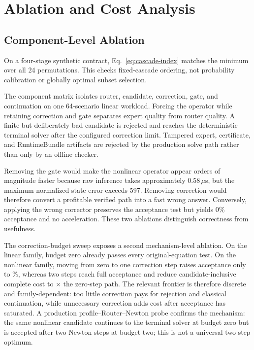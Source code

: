 \section{Ablation and Cost Analysis}
\label{sec:ablation}

\subsection{Component-Level Ablation}

On a four-stage synthetic contract, Eq.~\eqref{eq:cascade-index} matches the
minimum over all 24 permutations. This checks fixed-cascade ordering, not
probability calibration or globally optimal subset selection.

The component matrix isolates router, candidate, correction, gate, and continuation on
one 64-scenario linear workload. Forcing the operator while
retaining correction and gate separates expert quality from router quality. A
finite but deliberately bad candidate is rejected and reaches the deterministic terminal
solver after the configured correction limit. Tampered expert, certificate, and
RuntimeBundle artifacts are rejected by the production solve path rather than only
by an offline checker.

Removing the gate would make the nonlinear operator appear orders of magnitude
faster because raw inference takes approximately $0.58\,\mu$s, but the maximum
normalized state error exceeds 597. Removing correction would therefore convert a
profitable verified path into a fast wrong answer. Conversely, applying the wrong
corrector preserves the acceptance test but yields 0\% acceptance and no acceleration. These
two ablations distinguish correctness from usefulness.

The correction-budget sweep exposes a second mechanism-level ablation. On the linear
family, budget zero already passes every original-equation test. On the nonlinear
family, moving from zero to one correction step raises acceptance only to
\NonlinearBudgetOneAcceptancePercent\%, whereas two steps reach full acceptance and
reduce candidate-inclusive complete cost to
\NonlinearBudgetTwoVsZeroCostRatio{}$\times$ the zero-step path. The relevant frontier
is therefore discrete and family-dependent: too little correction pays for rejection
and classical continuation, while unnecessary correction adds cost after acceptance
has saturated. A production profile--Router--Newton probe confirms the mechanism: the
same nonlinear candidate continues to the terminal solver at budget zero but is accepted after two Newton
steps at budget two; this is not a universal two-step optimum.

